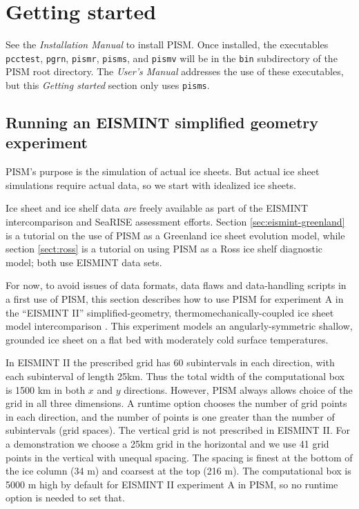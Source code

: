 
\section{Getting started}\label{sect:start}

See the \emph{Installation Manual} to install PISM.  Once installed, the executables \verb|pcctest|, \verb|pgrn|, \verb|pismr|, \verb|pisms|, and \verb|pismv| will be in the \verb|bin| subdirectory of the PISM root directory.  The \emph{User's Manual} addresses the use of these executables, but this \emph{Getting started} section only uses \verb|pisms|.
 
\subsection{Running an EISMINT simplified geometry experiment}  PISM's purpose is the simulation of actual ice sheets.  But actual ice sheet simulations require actual data, so we start with idealized ice sheets.

Ice sheet and ice shelf data \emph{are} freely available as part of the EISMINT intercomparison and SeaRISE assessment efforts.  Section \ref{sec:eismint-greenland} is a tutorial on the use of PISM as a Greenland ice sheet evolution model, while section \ref{sect:ross} is a tutorial on using PISM as a Ross ice shelf diagnostic model; both use EISMINT data sets.

For now, to avoid issues of data formats, data flaws and data-handling scripts in a first use of PISM, this section describes how to use PISM for experiment A in the ``EISMINT II'' simplified-geometry, thermomechanically-coupled ice sheet model intercomparison \cite{EISMINT00}.  This experiment models an angularly-symmetric shallow, grounded ice sheet on a flat bed with moderately cold surface temperatures.

In EISMINT II the prescribed grid has 60 subintervals in each direction, with each subinterval of length 25km.  Thus the total width of the computational box is 1500 km in both $x$ and $y$ directions.  However, PISM always allows choice of the grid in all three dimensions.  A runtime option chooses the number of grid points in each direction, and the number of points is one greater than the number of subintervals (grid spaces).  The vertical grid is not prescribed in EISMINT II.  For a demonstration we choose a 25km grid in the horizontal and we use 41 grid points in the vertical with unequal spacing.  The spacing is finest at the bottom of the ice column (34 m) and coarsest at the top (216 m).  The computational box is 5000 m high by default for EISMINT II experiment A in PISM, so no runtime option is needed to set that.

